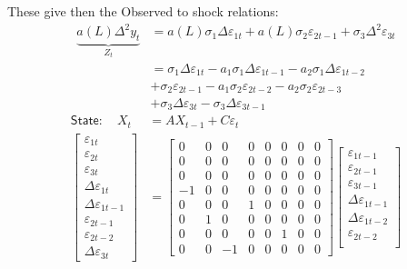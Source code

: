 \documentclass[a4paper,12pt]{article}
\begin{document}
These give then the Observed to shock relations:%
\begin{align*}
\underbrace{a(L)\Delta ^{2}y_{t}}_{Z_{t}}& =a(L)\sigma _{1}\Delta
\varepsilon _{1t}+a(L)\sigma _{2}\varepsilon _{2t-1}+\sigma _{3}\Delta
^{2}\varepsilon _{3t} \\[-6mm]
& =\sigma _{1}\Delta \varepsilon _{1t}-a_{1}\sigma _{1}\Delta \varepsilon
_{1t-1}-a_{2}\sigma _{1}\Delta \varepsilon _{1t-2} \\
& +\sigma _{2}\varepsilon _{2t-1}-a_{1}\sigma _{2}\varepsilon
_{2t-2}-a_{2}\sigma _{2}\varepsilon _{2t-3} \\
& +\sigma _{3}\Delta \varepsilon _{3t}-\sigma _{3}\Delta \varepsilon _{3t-1}
\end{align*}%
\begin{align}
\mathsf{State}:\quad X_{t}& =AX_{t-1}+C\varepsilon _{t} \\
\begin{bmatrix}
\varepsilon _{1t} \\
\varepsilon _{2t} \\
\varepsilon _{3t} \\
\Delta \varepsilon _{1t} \\
\Delta \varepsilon _{1t-1} \\
\varepsilon _{2t-1} \\
\varepsilon _{2t-2} \\
\Delta \varepsilon _{3t}%
\end{bmatrix}%
& =%
\begin{bmatrix}
0 & 0 & 0 & 0 & 0 & 0 & 0 & 0 \\
0 & 0 & 0 & 0 & 0 & 0 & 0 & 0 \\
0 & 0 & 0 & 0 & 0 & 0 & 0 & 0 \\
-1 & 0 & 0 & 0 & 0 & 0 & 0 & 0 \\
0 & 0 & 0 & 1 & 0 & 0 & 0 & 0 \\
0 & 1 & 0 & 0 & 0 & 0 & 0 & 0 \\
0 & 0 & 0 & 0 & 0 & 1 & 0 & 0 \\
0 & 0 & -1 & 0 & 0 & 0 & 0 & 0%
\end{bmatrix}%
\begin{bmatrix}
\varepsilon _{1t-1} \\
\varepsilon _{2t-1} \\
\varepsilon _{3t-1} \\
\Delta \varepsilon _{1t-1} \\
\Delta \varepsilon _{1t-2} \\
\varepsilon _{2t-2} \\

\end{bmatrix}
\end{align}
\end{document}
